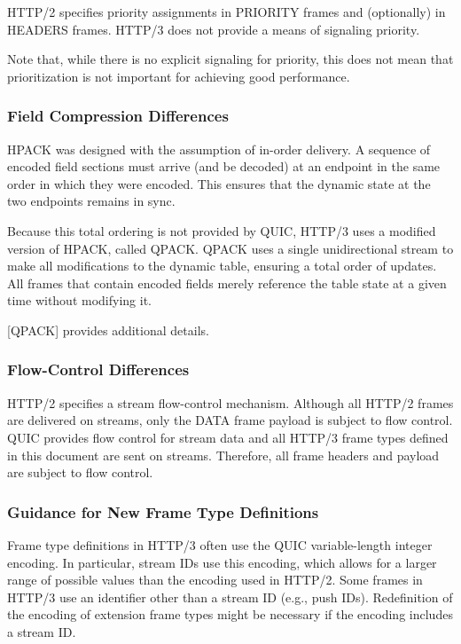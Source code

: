 \documentclass{article}
\begin{document}
HTTP/2 specifies priority assignments in PRIORITY frames and (optionally) in HEADERS frames.  HTTP/3 does not provide a means of signaling priority.

Note that, while there is no explicit signaling for priority, this does not mean that prioritization is not important for achieving good performance.

\subsubsection{Field Compression Differences}

HPACK was designed with the assumption of in-order delivery.  A sequence of encoded field sections must arrive (and be decoded) at an endpoint in the same order in which they were encoded.  This ensures that the dynamic state at the two endpoints remains in sync.

Because this total ordering is not provided by QUIC, HTTP/3 uses a modified version of HPACK, called QPACK.  QPACK uses a single unidirectional stream to make all modifications to the dynamic table, ensuring a total order of updates.  All frames that contain encoded fields merely reference the table state at a given time without modifying it.

[QPACK] provides additional details.

\subsubsection{Flow-Control Differences}

HTTP/2 specifies a stream flow-control mechanism.  Although all HTTP/2 frames are delivered on streams, only the DATA frame payload is subject to flow control.  QUIC provides flow control for stream data and all HTTP/3 frame types defined in this document are sent on streams.  Therefore, all frame headers and payload are subject to flow control.

\subsubsection{Guidance for New Frame Type Definitions}

Frame type definitions in HTTP/3 often use the QUIC variable-length integer encoding.  In particular, stream IDs use this encoding, which allows for a larger range of possible values than the encoding used in HTTP/2.  Some frames in HTTP/3 use an identifier other than a stream ID (e.g., push IDs).  Redefinition of the encoding of extension frame types might be necessary if the encoding includes a stream ID.
\end{document}
